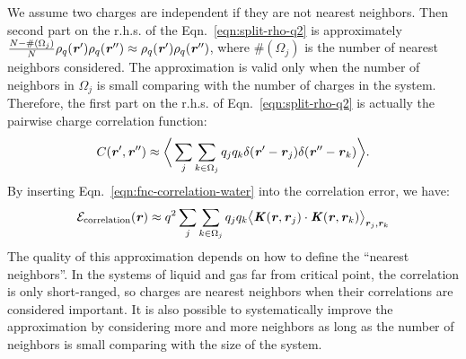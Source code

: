 \documentclass[aps,pre,preprint,unsortedaddress]{revtex4}
\renewcommand{\v}[1]{\textbf{\textit{#1}}}
\begin{document}
We assume two charges are independent if they are not nearest neighbors.
Then
second part on the r.h.s. of the Eqn.~\eqref{eqn:split-rho-q2} is
approximately $\frac{N-\#(\Omega_j)}{N}\rho_q(\v r')\rho_q(\v r'')\approx
\rho_q(\v r')\rho_q(\v r'')$,
where $\#(\Omega_j)$ is the number of nearest neighbors considered.
The approximation is valid only when the number
of neighbors in $\Omega_j$ is small comparing with the number of charges
in the system.
Therefore, the first part
on the r.h.s. of Eqn.~\eqref{eqn:split-rho-q2} is actually the
pairwise charge correlation function:
\begin{align}\label{eqn:fnc-correlation-water}
  C(\v r', \v r'') \approx
  \bigg\langle
  \sum_j\sum_{k\in\Omega_j}q_jq_k\delta(\v r' - \v r_j)\delta(\v r'' - \v r_k)
  \bigg\rangle.
\end{align}
By inserting Eqn.~\eqref{eqn:fnc-correlation-water} into
the correlation error, we have:
\begin{align}
  \mathcal E_{\textrm{correlation}}(\v r)
  \approx q^2\sum_j\sum_{k\in\Omega_j}q_jq_k
  \big\langle
  \v K(\v r , \v r_j)\cdot\v K(\v r , \v r_k)
  \big\rangle_{\v r_j,\v r_k}
\end{align}
The quality of this approximation depends on how to define the
``nearest neighbors''. In the systems
of liquid and gas far from critical point,
the correlation is only short-ranged, so charges are nearest neighbors when
their correlations are considered important.
It is also possible to systematically
improve the approximation by considering more and more neighbors as long as
the number of neighbors is small comparing with the size of the system.
\end{document}
